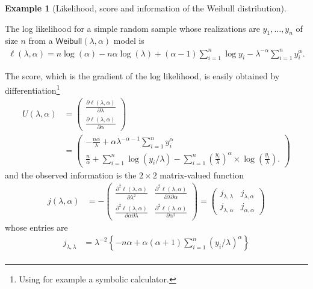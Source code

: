 \documentclass[
  11pt,
  letterpaper,
]{scrbook}
\theoremstyle{definition}
\newtheorem{example}{Example}[chapter]
\theoremstyle{plain}
\theoremstyle{plain}
\theoremstyle{plain}
\theoremstyle{definition}
\theoremstyle{definition}
\theoremstyle{plain}
\theoremstyle{plain}
\theoremstyle{remark}
\begin{document}
\begin{example}[Likelihood, score and information of the Weibull
distribution]\protect\hypertarget{exm-weibull-info}{}\label{exm-weibull-info}

The log likelihood for a simple random sample whose realizations are
\(y_1, \ldots, y_n\) of size \(n\) from a
\(\mathsf{Weibull}(\lambda, \alpha)\) model is \begin{align*}
\ell(\lambda, \alpha) = n \log(\alpha) - n\alpha\log(\lambda) + (\alpha-1) \sum_{i=1}^n \log y_i  - \lambda^{-\alpha}\sum_{i=1}^n y_i^\alpha.
\end{align*}

The score, which is the gradient of the log likelihood, is easily
obtained by differentiation\footnote{Using for example a symbolic
  calculator.} \begin{align*}
U(\lambda, \alpha) &= \begin{pmatrix}\frac{\partial \ell(\lambda, \alpha)}{\partial \lambda} \\
\frac{\partial \ell(\lambda, \alpha)}{\partial \alpha} \end{pmatrix} \\&=
\begin{pmatrix}
 -\frac{n\alpha}{\lambda} +\alpha\lambda^{-\alpha-1}\sum_{i=1}^n y_i^\alpha
 \\
 \frac{n}{\alpha} + \sum_{i=1}^n \log (y_i/\lambda)  - \sum_{i=1}^n \left(\frac{y_i}{\lambda}\right)^{\alpha} \times\log\left(\frac{y_i}{\lambda}\right).
 \end{pmatrix}
\end{align*} and the observed information is the \(2 \times 2\)
matrix-valued function \begin{align*}
j(\lambda, \alpha) &= - \begin{pmatrix}
\frac{\partial^2 \ell(\lambda, \alpha)}{\partial \lambda^2} &  \frac{\partial^2 \ell(\lambda, \alpha)}{\partial \lambda \partial \alpha} \\ \frac{\partial^2 \ell(\lambda, \alpha)}{\partial \alpha \partial \lambda} & \frac{\partial^2 \ell(\lambda, \alpha)}{\partial \alpha^2}
\end{pmatrix}  = \begin{pmatrix} j_{\lambda, \lambda} & j_{\lambda, \alpha} \\ j_{\lambda, \alpha} & j_{\alpha, \alpha} \end{pmatrix}
\end{align*} whose entries are \begin{align*}
j_{\lambda, \lambda} &= \lambda^{-2}\left\{-n\alpha + \alpha(\alpha+1)\sum_{i=1}^n (y_i/\lambda)^\alpha\right\} \\

\end{align*}
\end{example}
\end{document}
